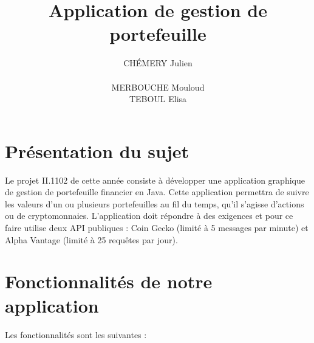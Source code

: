 \documentclass[12pt]{article}
\title{%
 Application de gestion de portefeuille}
\author{CHÉMERY Julien \\
\\
MERBOUCHE Mouloud
\\ 
TEBOUL Elisa}
\begin{document}


\sffamily

\fancyhf{}
\fancyhead[R]{}
\fancyfoot[R]{ \bf\thepage\ \rm }%

\newpage


\pagebreak

\tableofcontents

\thispagestyle{empty}

\listoffigures

\newpage

\section{Présentation du sujet}

Le projet II.1102 de cette année consiste à développer une application graphique de gestion de portefeuille financier en Java. Cette application permettra de suivre les valeurs d'un ou plusieurs portefeuilles au fil du temps, qu'il s'agisse d'actions ou de cryptomonnaies. L'application doit répondre à des exigences et pour ce faire utilise deux API publiques : Coin Gecko (limité à 5 messages par minute) et Alpha Vantage (limité à 25 requêtes par jour).

\section{Fonctionnalités de notre application}

Les fonctionnalités sont les suivantes :
\end{document}
